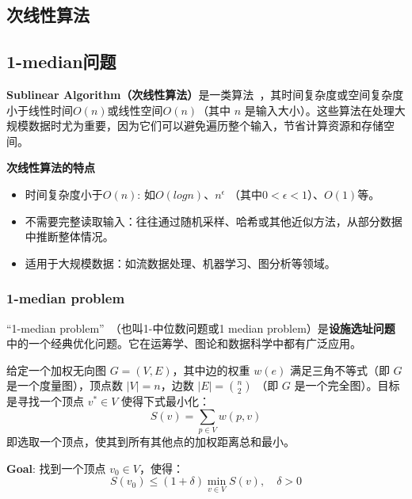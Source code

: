 \documentclass[lang=cn,newtx,10pt,scheme=chinese,chinesefont=nofont,citestyle=gb7714-2015, bibstyle=gb7714-2015]{elegantbook}
\begin{document}
\begin{refsection}
\chapter{次线性算法}
\section{1-median问题}
\textbf{Sublinear Algorithm（次线性算法）}是一类算法~\cite{rubinfeld2011sublinear}，其时间复杂度或空间复杂度小于线性时间$O(n)$或线性空间$O(n)$（其中
$n$ 是输入大小）。这些算法在处理大规模数据时尤为重要，因为它们可以避免遍历整个输入，节省计算资源和存储空间。

\textbf{次线性算法的特点}
\begin{itemize}
    \item 时间复杂度小于$O(n)$: 如$O(logn)$、$n^{\epsilon}$ （其中$0<\epsilon<1$）、$O(1)$等。
    \item 不需要完整读取输入：往往通过随机采样、哈希或其他近似方法，从部分数据中推断整体情况。
    \item 适用于大规模数据：如流数据处理、机器学习、图分析等领域。
\end{itemize}


\subsection{1-median problem}
``1-median problem''~\cite{indyk1999sublinear}（也叫1-中位数问题或1 median problem）是\textbf{设施选址问题}中的一个经典优化问题。它在运筹学、图论和数据科学中都有广泛应用。

\begin{definition}
    给定一个加权无向图 \( G = (V, E) \)，其中边的权重 \( w(e) \) 满足三角不等式（即 \( G \) 是一个度量图），顶点数 \( |V| = n \)，边数 \( |E| = \binom{n}{2} \) （即 \( G \) 是一个完全图）。目标是寻找一个顶点 \( v^* \in V \) 使得下式最小化：
\[
S(v) = \sum_{p \in V} w(p, v)
\]
即选取一个顶点，使其到所有其他点的加权距离总和最小。
\end{definition}

\textbf{Goal}:  
找到一个顶点 \( v_0 \in V \)，使得：
\[
S(v_0) \leq (1+\delta) \min\limits_{v \in V} S(v), \quad \delta > 0
\]


\end{refsection}
\end{document}
